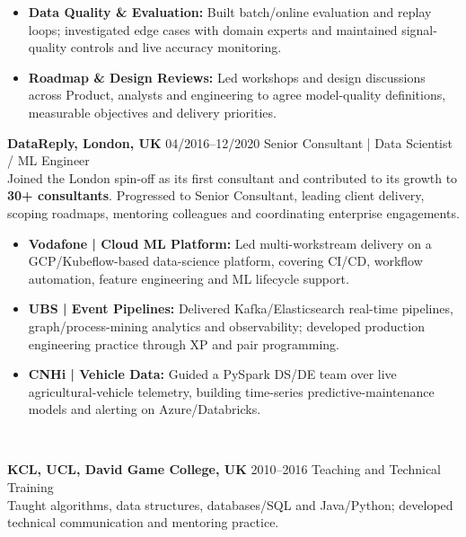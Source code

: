 \documentclass[]{../../../../friggeri-cv}
\renewcommand{\entry}[4]{%
  \parbox[t]{\dimexpr\textwidth-\entryleftinset\relax}{%
    \textbf{#2}%
    {\footnotesize\addfontfeature{Color=lightgray}\hspace{0.6em}#1}%
    \hfill%
    {\small\color{textcolor} #3}\\%
    #4\vspace{\parsep}%
  }\\}
\begin{document}
\begin{entrylist}
{\begin{itemize}[leftmargin=1.1em, itemsep=2pt, topsep=3pt, parsep=0pt]
            \item \small\textbf{Data Quality \& Evaluation:} Built batch/online evaluation and replay loops; investigated edge cases with domain experts and maintained signal-quality controls and live accuracy monitoring.
            \item \small\textbf{Roadmap \& Design Reviews:} Led workshops and design discussions across Product, analysts and engineering to agree model-quality definitions, measurable objectives and delivery priorities.
        \end{itemize}
    }
    \entry
    {04/2016--12/2020}
    {DataReply, London, UK}
    {Senior Consultant | Data Scientist / ML Engineer}
    {
        {\small
        \setlength{\parindent}{0pt}
        \setlength{\leftskip}{0pt}
        Joined the London spin-off as its first consultant and contributed to its growth to \textbf{30+ consultants}. Progressed to Senior Consultant, leading client delivery, scoping roadmaps, mentoring colleagues and coordinating enterprise engagements.
        }
        \begin{itemize}[leftmargin=1.1em, itemsep=2pt, topsep=3pt, parsep=0pt]
            \item \small\textbf{Vodafone | Cloud ML Platform:} Led multi-workstream delivery on a GCP/Kubeflow-based data-science platform, covering CI/CD, workflow automation, feature engineering and ML lifecycle support.
            \item \small\textbf{UBS | Event Pipelines:} Delivered Kafka/Elasticsearch real-time pipelines, graph/process-mining analytics and observability; developed production engineering practice through XP and pair programming.
            \item \small\textbf{CNHi | Vehicle Data:} Guided a PySpark DS/DE team over live agricultural-vehicle telemetry, building time-series predictive-maintenance models and alerting on Azure/Databricks.
        \end{itemize}
    }
    \entry
    {2010--2016}
    {KCL, UCL, David Game College, UK}
    {Teaching and Technical Training}
    {\small Taught algorithms, data structures, databases/SQL and Java/Python; developed technical communication and mentoring practice.}
\end{entrylist}
\newpage
\setlength{\parskip}{2pt}
\setlength{\parsep}{0pt}
\end{document}
